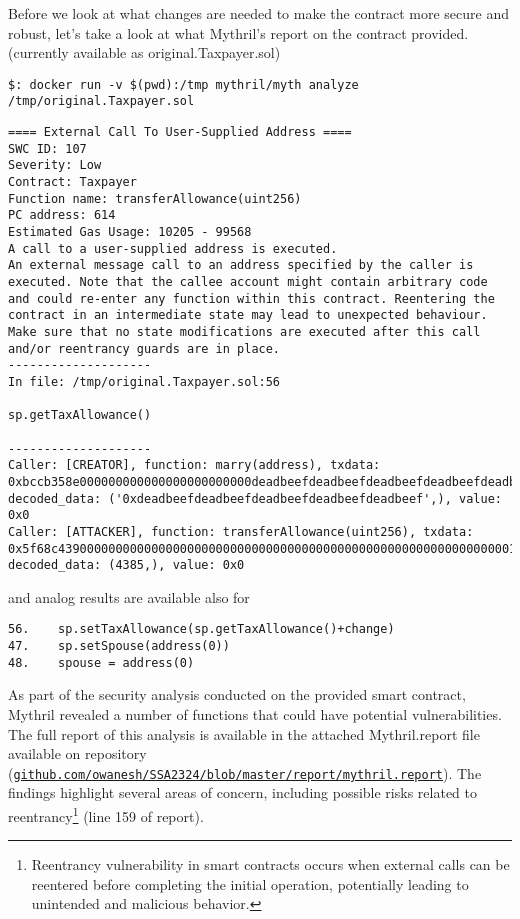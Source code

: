 \documentclass{article}
\begin{document}
Before we look at what changes are needed to make the contract more secure and robust, let's take a look at what Mythril's report on the contract provided. (currently available as original.Taxpayer.sol)
\begin{verbatim}
$: docker run -v $(pwd):/tmp mythril/myth analyze /tmp/original.Taxpayer.sol
\end{verbatim}
\begin{verbatim}
==== External Call To User-Supplied Address ====
SWC ID: 107
Severity: Low
Contract: Taxpayer
Function name: transferAllowance(uint256)
PC address: 614
Estimated Gas Usage: 10205 - 99568
A call to a user-supplied address is executed.
An external message call to an address specified by the caller is executed. Note that the callee account might contain arbitrary code and could re-enter any function within this contract. Reentering the contract in an intermediate state may lead to unexpected behaviour. Make sure that no state modifications are executed after this call and/or reentrancy guards are in place.
--------------------
In file: /tmp/original.Taxpayer.sol:56

sp.getTaxAllowance()

--------------------
Caller: [CREATOR], function: marry(address), txdata: 0xbccb358e000000000000000000000000deadbeefdeadbeefdeadbeefdeadbeefdeadbeef, decoded_data: ('0xdeadbeefdeadbeefdeadbeefdeadbeefdeadbeef',), value: 0x0
Caller: [ATTACKER], function: transferAllowance(uint256), txdata: 0x5f68c4390000000000000000000000000000000000000000000000000000000000001121, decoded_data: (4385,), value: 0x0
\end{verbatim}
and analog results are available also for
\begin{verbatim}
56.    sp.setTaxAllowance(sp.getTaxAllowance()+change)
47.    sp.setSpouse(address(0))
48.    spouse = address(0)
\end{verbatim}
As part of the security analysis conducted on the provided smart contract, Mythril revealed a number of functions that could have potential vulnerabilities. 
The full report of this analysis is available in the attached Mythril.report file available on repository 
(\texttt{\href{https://github.com/Owanesh/SSA2324/blob/main/report/mythril.report}{github.com/owanesh/SSA2324/blob/master/report\linebreak/mythril.report}}). 
The findings highlight several areas of concern, including possible risks related to 
reentrancy\footnote{Reentrancy vulnerability in smart contracts occurs when external calls can be reentered before completing the initial operation, potentially leading to unintended and malicious behavior.} (line 159 of report). 
\end{document}
